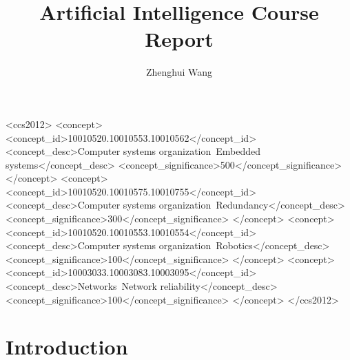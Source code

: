 \documentclass[sigconf]{acmart}
\begin{document}
	\title{Artificial Intelligence Course Report}
	
	
	\author{Zhenghui Wang}
	

	
	\renewcommand{\shortauthors}{Zhenghui Wang}
	
	
	\begin{abstract}
	
	\end{abstract}
	
	\begin{CCSXML}
		<ccs2012>
		<concept>
		<concept_id>10010520.10010553.10010562</concept_id>
		<concept_desc>Computer systems organization~Embedded systems</concept_desc>
		<concept_significance>500</concept_significance>
		</concept>
		<concept>
		<concept_id>10010520.10010575.10010755</concept_id>
		<concept_desc>Computer systems organization~Redundancy</concept_desc>
		<concept_significance>300</concept_significance>
		</concept>
		<concept>
		<concept_id>10010520.10010553.10010554</concept_id>
		<concept_desc>Computer systems organization~Robotics</concept_desc>
		<concept_significance>100</concept_significance>
		</concept>
		<concept>
		<concept_id>10003033.10003083.10003095</concept_id>
		<concept_desc>Networks~Network reliability</concept_desc>
		<concept_significance>100</concept_significance>
		</concept>
		</ccs2012>  
	\end{CCSXML}
	
	
	
	
	
	\maketitle
	
	
	\section{Introduction}
	
\end{document}
